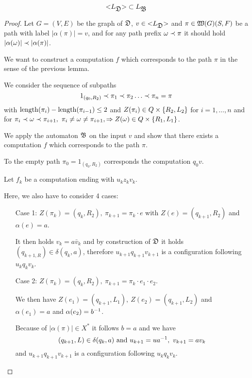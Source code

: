 \bigskip
\begin{lemma}
\[ \mbox{${<}{L_{\mbox{$\mathfrak{D}$}}}{>}$} \subset L_{\mbox{$\mathfrak{B}$}} \]
\end{lemma}

\begin{proof}
Let $G = (V, E)$ be the graph of $\mbox{$\mathfrak{D}$}$, $v \in \mbox{${<}{L_{\mbox{$\mathfrak{D}$}}}{>}$}$ and
$\pi \in \mbox{$\mathfrak{W}({G})$}(S, F)$ be a path with label $|\alpha(\pi)| = v$, and for
any path prefix $\omega \prec \pi$ it should hold $|\alpha(\omega)| \prec
|\alpha(\pi)|$.

We want to construct a computation $f$ which corresponds to the path $\pi$ in
the sense of the previous lemma.

We consider the sequence of subpaths
\[ 1_{(q_0, R_2)} \prec \pi_1 \prec \pi_2 \ldots \prec \pi_n = \pi \]
with $\mathrm{length}({\pi_i}) - \mathrm{length}({\pi_{i-1}}) \leq 2$ and $Z(\pi_i) \in Q \times
\mbox{$\{R_2, L_2\}$}$ for $i = 1, \ldots, n$ and for $\pi_i \prec \omega \prec
\pi_{i+1},\ \pi_i \neq \omega \neq \pi_{i+1}, \Rightarrow Z(\omega) \in Q \times
\mbox{$\{R_1, L_1\}$}$.

We apply the automaton $\mbox{$\mathfrak{B}$}$ on the input $v$ and show that there exists a
computation $f$ which corresponds to the path $\pi$.

\medskip
To the empty path $\pi_0 = 1_{(q_0, R_2)}$ corresponds the computation $q_0 v$.

Let $f_k$ be a computation ending with $u_k z_k v_k$.

Here, we also have to consider 4 cases:

\begin{itemize}
  \item[Case 1:] $Z(\pi_k) = (q_k, R_2),\ \pi_{k+1} = \pi_k \cdot e$ with $Z(e)
  = (q_{k+1}, R_2)$ and $\alpha(e) = a$.
  
  It then holds $v_k = a \bar{v}_k$ and by construction of $\mbox{$\mathfrak{D}$}$ it holds
  $(q_{k+1, R}) \in \delta(q_k, a)$, therefore $u_{k+1} q_{k+1} v_{k+1}$ is
  a configuration following $u_k q_k v_k$.
   
  \item[Case 2:] $Z(\pi_k) = (q_k, R_2),\ \pi_{k+1} = \pi_k \cdot e_1 \cdot
  e_2$.
  
  We then have $Z(e_1) = (q_{k+1}, L_1),\ Z(e_2) = (q_{k+1}, L_2)$ and
  $\alpha(e_1) = a$ and $\alpha(e_2) = {{b}^{-1}}$.
  
  Because of $|\alpha(\pi)| \in X^*$ it follows $b = a$ and we have
  \[ (q_{k+1}, L) \in \delta(q_k, a)\text{ and }u_{k+1} = u {{a}^{-1}},\
  v_{k+1} = a v_k \]
  and $u_{k+1} q_{k+1} v_{k+1}$ is a configuration following $u_k q_k v_k$.
  

\end{itemize}
\end{proof}

